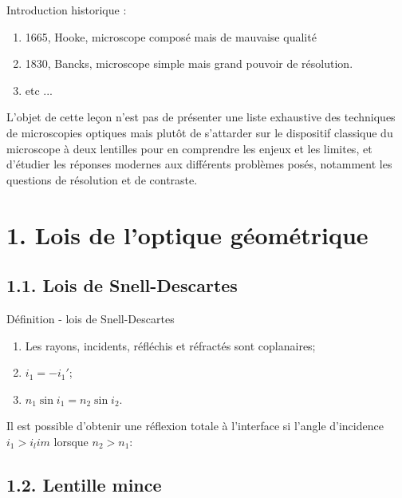 \documentclass[french, a4paper, 10pt, twocolumn, landscape]{article}
\begin{document}
Introduction historique : 
\begin{enumerate}
	\item 1665, Hooke, microscope composé mais de mauvaise qualité 
	\item 1830, Bancks, microscope simple mais grand pouvoir de résolution.
	\item etc ...
\end{enumerate}

L’objet de cette leçon n’est pas de présenter une liste exhaustive des techniques de microscopies optiques mais
plutôt de s’attarder sur le dispositif classique du microscope à deux lentilles pour en comprendre les enjeux et les limites, et d’étudier les réponses modernes aux différents problèmes posés, notamment les questions de résolution et
de contraste.

\section*{1. Lois de l'optique géométrique}
\subsection*{1.1. Lois de Snell-Descartes}


	\begin{definition}{Définition - lois de Snell-Descartes}
\begin{enumerate}
			\item Les rayons, incidents, réfléchis et réfractés sont coplanaires;
			\item $i_1 = -i_1'$;
			\item $n_1\sin{i_1} = n_2\sin{i_2}$.
		\end{enumerate}
	\end{definition}

Il est possible d'obtenir une réflexion totale à l'interface si l'angle d'incidence $i_1>i_lim$ lorsque $n_2>n_1$: 


\subsection*{1.2. Lentille mince}
\end{document}
